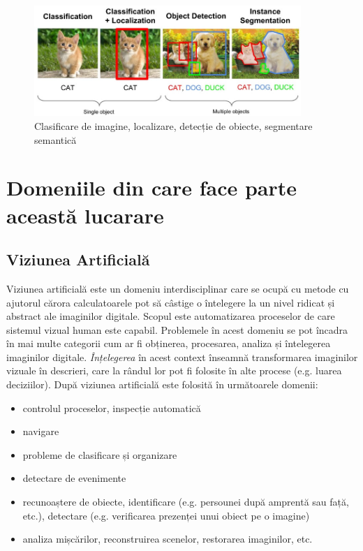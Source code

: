 \begin{figure}[h!]
    	\centering
	\captionsetup{justification=centering, margin=2cm}
	\includegraphics[width=0.9\textwidth]{figures/class_detect_segment.jpeg}
	\caption{Clasificare de imagine, localizare, detecție de obiecte, segmentare semantică \cite{class_detect_segment}}
	\label{fig:class_detect_semgent}
\end{figure}
\section{Domeniile din care face parte această lucarare}
\subsection{Viziunea Artificială}
Viziunea artificială este un domeniu interdisciplinar care se ocupă cu metode cu ajutorul cărora calculatoarele pot să câstige o întelegere la un nivel ridicat și abstract ale imaginilor digitale. Scopul este automatizarea proceselor de care sistemul vizual human este capabil.\newline
Problemele în acest domeniu se pot încadra în mai multe categorii cum ar fi obținerea, procesarea, analiza și întelegerea imaginilor digitale. \textit{Înțelegerea} în acest context înseamnă transformarea imaginilor vizuale în descrieri, care la rândul lor pot fi folosite în alte procese (e.g. luarea deciziilor). După \cite{Szeliski10computervision} viziunea artificială este folosită în următoarele domenii:
\begin{itemize}
	\item controlul proceselor, inspecție automatică
	\item navigare
	\item probleme de clasificare și organizare
	\item detectare de evenimente
	\item recunoaștere de obiecte, identificare (e.g. persounei după amprentă sau față, etc.), detectare (e.g. verificarea prezenței unui obiect pe o imagine)
	\item analiza mișcărilor, reconstruirea scenelor, restorarea imaginilor, etc.
\end{itemize}
